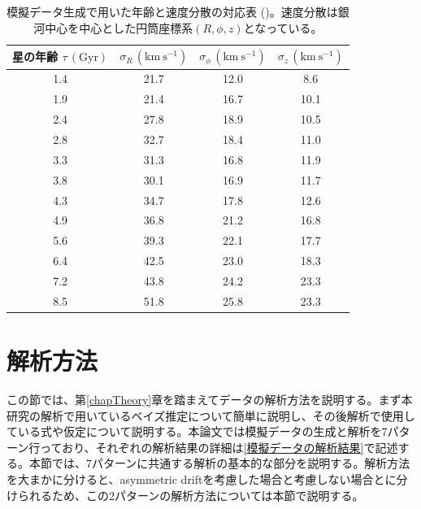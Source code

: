 \begin{table}
\begin{center}
\begin{tabular}{c|c|c|c} \hline
 \rowcolor{LightCyan}
 星の年齢 $\tau\,\mathrm{(Gyr)}$ & $\sigma_R\,\mathrm{(km\ s^{-1})}$ & $\sigma_{\phi}\,\mathrm{(km\ s^{-1})}$ & $\sigma_{z}\,\mathrm{(km\ s^{-1})}$\\
 \hline
 1.4 & 21.7 & 12.0 & 8.6\\
 \hline
 1.9 & 21.4 & 16.7 & 10.1\\
 \hline
 2.4 & 27.8 & 18.9 & 10.5\\
 \hline
 2.8 & 32.7 & 18.4 & 11.0\\
 \hline
 3.3 & 31.3 & 16.8 & 11.9\\
 \hline
 3.8 & 30.1 & 16.9 & 11.7\\
 \hline
 4.3 & 34.7 & 17.8 & 12.6\\
 \hline
 4.9 & 36.8 & 21.2 & 16.8\\
 \hline
 5.6 & 39.3 & 22.1 & 17.7\\
 \hline
 6.4 & 42.5 & 23.0 & 18.3\\
 \hline
 7.2 & 43.8 & 24.2 & 23.3\\
 \hline
 8.5 & 51.8 & 25.8 & 23.3\\
 \hline
\end{tabular} \label{VelocityDispersion}
\vspace{3mm}
\caption{模擬データ生成で用いた年齢と速度分散の対応表 (\cite{YL18})。速度分散は銀河中心を中心とした円筒座標系$(R,\phi,z)$となっている。}
\end{center}
\end{table}


\section{解析方法}
この節では、第\ref{chapTheory}章を踏まえてデータの解析方法を説明する。まず本研究の解析で用いているベイズ推定について簡単に説明し、その後解析で使用している式や仮定について説明する。本論文では模擬データの生成と解析を7パターン行っており、それぞれの解析結果の詳細は\ref{模擬データの解析結果}で記述する。本節では、7パターンに共通する解析の基本的な部分を説明する。解析方法を大まかに分けると、asymmetric driftを考慮した場合と考慮しない場合とに分けられるため、この2パターンの解析方法については本節で説明する。


